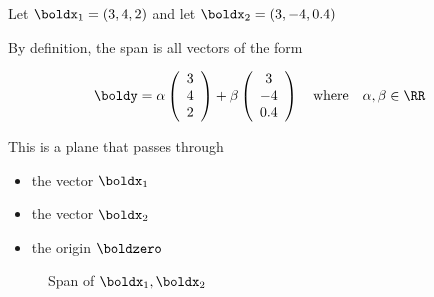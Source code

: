 \begin{frame}

    \vspace{2em}
    \Eg
    Let $\boldx_1 = (3, 4, 2)$ and let $\boldx_2 = (3, -4, 0.4)$

    \vspace{1em}
    By definition, the span is all vectors of the form


    \begin{equation*}
        \boldy = 
        \alpha \left(
        \begin{array}{c}
            3 \\
            4 \\
            2
        \end{array}
        \right)
        +
        \beta \left(
        \begin{array}{c}
             3 \\
             -4 \\
             0.4
        \end{array}
        \right)
        \quad \text{where} \quad
        \alpha, \beta \in \RR
    \end{equation*}
    
    This is a plane that passes through
    \begin{itemize}
        \item the vector $\boldx_1$
        \item the vector $\boldx_2$
        \item the origin $\boldzero$
    \end{itemize}


\end{frame}


\begin{frame}

    \vspace{2em}
   \begin{figure}
       \caption{\label{f:span_plane} Span of $\boldx_1, \boldx_2$}
   \end{figure}

\end{frame}




    
%    
%
    
